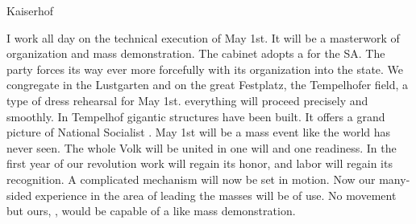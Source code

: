Kaiserhof

I work all day on the technical execution of May 1st. It will be a masterwork of organization and mass demonstration. The cabinet adopts a  for the SA. The party forces its way ever more forcefully with its organization into the state. We congregate in the Lustgarten and on the great Festplatz, the Tempelhofer field, a type of dress rehearsal for May 1st.  everything will proceed precisely and smoothly. In Tempelhof gigantic structures have been built. It offers a grand picture of National Socialist . May 1st will be a mass event like the world has never seen. The whole Volk will be united in one will and one readiness. In the first year of our revolution work will regain its honor, and labor will regain its recognition. A complicated mechanism will now be set in motion. Now our many-sided experience in the area of leading the masses will be of use. No movement but ours, , would be capable of a like mass demonstration.